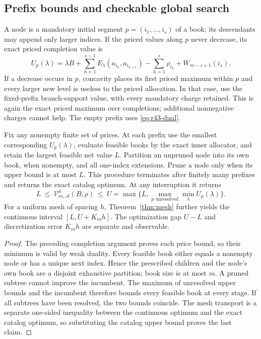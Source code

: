 \subsection{Prefix bounds and checkable global search}
A node is a mandatory initial segment $p=(i_1,\ldots,i_s)$ of a book; its descendants may append only larger indices. If the priced values along $p$ never decrease, its exact priced completion value is
\begin{equation}\label{eq:r43-prefix-bound}
 U_p(\lambda)=\lambda B+\sum_{h=1}^{s-1}E_\lambda(a_{i_h},a_{i_{h+1}})
 -\sum_{h=1}^s\rho_{i_h}+W_{m-s+1}(i_s).
\end{equation}
If a decrease occurs in $p$, concavity places its first priced maximum within $p$ and every larger new level is useless to the priced allocation. In that case, use the fixed-prefix branch-support value, with every mandatory charge retained. This is again the exact priced maximum over completions; additional nonnegative charges cannot help. The empty prefix uses \eqref{eq:r43-dual}.

\begin{theorem}\label{thm:r43-search}
Fix any nonempty finite set of prices. At each prefix use the smallest corresponding $U_p(\lambda)$, evaluate feasible books by the exact inner allocator, and retain the largest feasible net value $L$. Partition an unpruned node into its own book, when nonempty, and all one-index extensions. Prune a node only when its upper bound is at most $L$. This procedure terminates after finitely many prefixes and returns the exact catalog optimum. At any interruption it returns
\begin{equation}\label{eq:r43-interval}
 L\ \leq\ \mathcal V_{m,\mathcal A}^\delta(B;\rho)\ \leq\
 U=\max\{L,\max_{p\text{ unresolved}}\min_\lambda U_p(\lambda)\}.
\end{equation}
For a uniform mesh of spacing $h$, Theorem~\ref{thm:mesh} further yields the continuous interval $[L,U+K_mh]$. The optimization gap $U-L$ and discretization error $K_mh$ are separate and observable.
\end{theorem}
\begin{proof}
The preceding completion argument proves each price bound, so their minimum is valid by weak duality. Every feasible book either equals a nonempty node or has a unique next index. Hence the prescribed children and the node's own book are a disjoint exhaustive partition; book size is at most $m$. A pruned subtree cannot improve the incumbent. The maximum of unresolved upper bounds and the incumbent therefore bounds every feasible book at every stage. If all subtrees have been resolved, the two bounds coincide. The mesh transport is a separate one-sided inequality between the continuous optimum and the exact catalog optimum, so substituting the catalog upper bound proves the last claim.
\end{proof}

